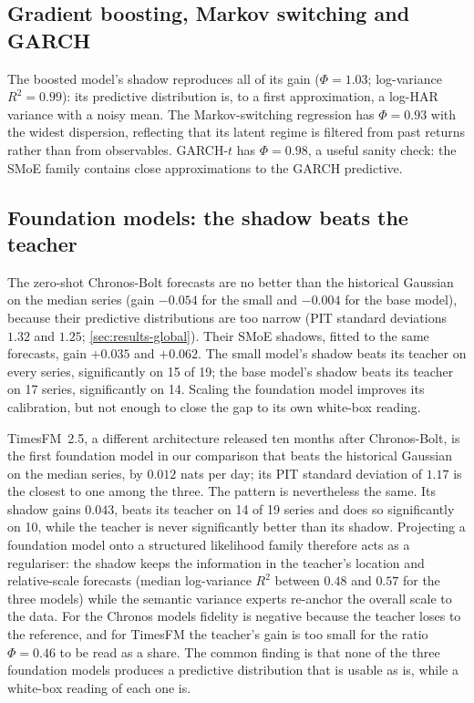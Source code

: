 \subsection{Gradient boosting, Markov switching and GARCH}
The boosted model's shadow reproduces all of its gain ($\Phi=1.03$; log-variance $R^2=0.99$): its
predictive distribution is, to a first approximation, a log-HAR variance with a noisy mean. The
Markov-switching regression has $\Phi=0.93$ with the widest dispersion, reflecting that its latent
regime is filtered from past returns rather than from observables. GARCH-$t$ has $\Phi=0.98$, a useful
sanity check: the SMoE family contains close approximations to the GARCH predictive.

\subsection{Foundation models: the shadow beats the teacher}
The zero-shot Chronos-Bolt forecasts are no better than the historical Gaussian on the median
series (gain $-0.054$ for the small and $-0.004$ for the base model), because their predictive
distributions are too narrow (PIT standard deviations $1.32$ and $1.25$; \cref{sec:results-global}).
Their SMoE shadows, fitted to the same forecasts, gain $+0.035$ and $+0.062$. The small model's shadow
beats its teacher on every series, significantly on 15 of 19; the base model's shadow beats its
teacher on 17 series, significantly on 14. Scaling the foundation model improves its calibration, but
not enough to close the gap to its own white-box reading.

TimesFM~2.5, a different architecture released ten months after Chronos-Bolt, is the first foundation model in
our comparison that beats the historical Gaussian on the median series, by $0.012$ nats per day; its
PIT standard deviation of $1.17$ is the closest to one among the three. The pattern is nevertheless
the same. Its shadow gains $0.043$, beats its teacher on 14 of 19 series and does so significantly on
10, while the teacher is never significantly better than its shadow. Projecting a foundation model
onto a structured likelihood family therefore acts as a regulariser: the shadow keeps the information
in the teacher's location and relative-scale forecasts (median log-variance $R^2$ between $0.48$ and
$0.57$ for the three models) while the semantic variance experts re-anchor the overall scale to the
data. For the Chronos models fidelity is negative because the teacher loses to the reference, and for
TimesFM the teacher's gain is too small for the ratio $\Phi=0.46$ to be read as a share. The common
finding is that none of the three foundation models produces a predictive distribution that is
usable as is, while a white-box reading of each one is.


